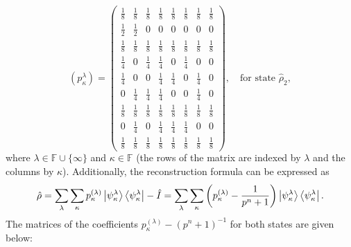 \documentclass[a4paper]{article}
\begin{document}
  \begin{equation}
    \left( p_{\kappa}^\lambda \right) =
    \displaystyle \left(\begin{array}{rrrrrrrr}
    \frac{1}{8} & \frac{1}{8} & \frac{1}{8} & \frac{1}{8} &
    \frac{1}{8} & \frac{1}{8} & \frac{1}{8} & \frac{1}{8} \\
    [6pt]
    \frac{1}{2} & \frac{1}{2} & 0 & 0 & 0 & 0 & 0 & 0 \\
    [6pt]
    \frac{1}{8} & \frac{1}{8} & \frac{1}{8} & \frac{1}{8} &
    \frac{1}{8} & \frac{1}{8} & \frac{1}{8} & \frac{1}{8} \\
    [6pt]
    \frac{1}{4} & 0 & \frac{1}{4} & \frac{1}{4} & 0 &
    \frac{1}{4} & 0 & 0 \\ [6pt]
    \frac{1}{4} & 0 & 0 & \frac{1}{4} & \frac{1}{4} & 0 &
    \frac{1}{4} & 0 \\ [6pt]
    0 & \frac{1}{4} & \frac{1}{4} & \frac{1}{4} & 0 & 0 &
    \frac{1}{4} & 0 \\ [6pt]
    \frac{1}{8} & \frac{1}{8} & \frac{1}{8} & \frac{1}{8} &
    \frac{1}{8} & \frac{1}{8} & \frac{1}{8} & \frac{1}{8} \\
    [6pt]
    0 & \frac{1}{4} & 0 & \frac{1}{4} & \frac{1}{4} &
    \frac{1}{4} & 0 & 0 \\ [6pt]
    \frac{1}{8} & \frac{1}{8} & \frac{1}{8} & \frac{1}{8} &
    \frac{1}{8} & \frac{1}{8} & \frac{1}{8} & \frac{1}{8}
    \end{array}\right),
    \quad
    \text{for state } \hat\rho_2,
  \end{equation}
  where $\lambda \in \mathbb F \cup \{\infty\}$ and $\kappa
  \in \mathbb F$ (the rows of the matrix are indexed by
  $\lambda$ and the columns by $\kappa$). Additionally, the
  reconstruction formula can be expressed as
  \begin{equation}
    \hat\rho
    = \sum_{\lambda}^{} \sum_{\kappa}^{} 
    p_\kappa^{(\lambda)} 
    \ket{\psi_\kappa^\lambda}\bra{\psi_\kappa^\lambda} -
    \hat I
    = \sum_{\lambda}^{} \sum_{\kappa}^{} 
    \left( p_\kappa^{(\lambda)} - \frac{1}{p^{n} + 1} \right) 
    \ket{\psi_\kappa^\lambda}\bra{\psi_\kappa^\lambda}.
  \end{equation}
  The matrices of the coefficients $p_\kappa^{(\lambda)} -
  (p^{n} + 1)^{-1}$ for both states are given below:
\end{document}
